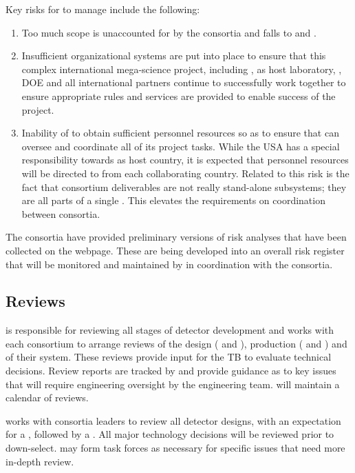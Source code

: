 Key risks for  to manage include the following:
\begin{enumerate}
    \item Too much scope is unaccounted for by the consortia and falls
      to  and .
    \item Insufficient organizational systems are put into place to
      ensure that this complex international mega-science project,
      including , \fnal as host laboratory, \surf, DOE and all international
      partners continue to successfully work together to ensure
      appropriate rules and services are provided to enable success of
      the project.
  \item Inability of  to obtain sufficient personnel resources so as to
    ensure that  can oversee and coordinate all of its
    project tasks.  While the USA has a special responsibility towards
     as host country, it is expected that personnel resources will
    be directed to  from each collaborating country. Related to this
    risk is the fact that consortium deliverables are not really
    stand-alone subsystems; they are all parts of a single . This
    elevates the requirements on coordination between consortia.
\end{enumerate}

The consortia have provided preliminary versions of risk analyses that
have been collected on the  webpage. These are being developed into
an overall risk register that will be monitored and maintained by 
in coordination with the consortia.

\subsection{Reviews}
\label{sec:fdsp-coord-reviews}

 is responsible for reviewing all stages of detector development
and works with each consortium to arrange reviews of the design
( and ), production ( and
) and  of their system.  These
reviews provide input for the TB to evaluate technical decisions.
Review reports are tracked by  and provide guidance as to
key issues that will require engineering oversight by the 
engineering team.  will maintain a calendar of 
reviews.

 works with consortia leaders to review all detector designs,
with an expectation for a , followed by a .  All
major technology decisions will be reviewed prior to down-select.  
may form task forces as necessary for specific issues that need more
in-depth review.



